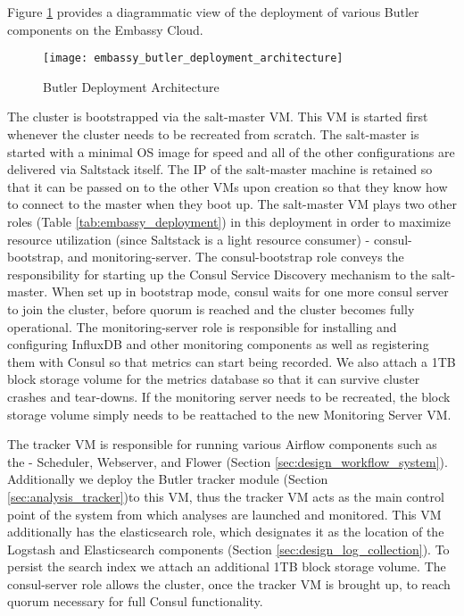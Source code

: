 Figure \ref{fig:embassy_butler_deployment_architecture} provides a diagrammatic view of the deployment of various Butler components on the Embassy Cloud.

\begin{figure}[h!]
\texttt{[image: embassy\_butler\_deployment\_architecture]}
\centering
\caption {Butler Deployment Architecture}
\label{fig:embassy_butler_deployment_architecture}
\end{figure}

The cluster is bootstrapped via the salt-master VM. This VM is started first whenever the cluster needs to be recreated from scratch. The salt-master is started with a minimal OS image for speed and all of the other configurations are delivered via Saltstack itself. The IP of the salt-master machine is retained so that it can be passed on to the other VMs upon creation so that they know how to connect to the master when they boot up. The salt-master VM plays two other roles (Table \ref{tab:embassy_deployment}) in this deployment in order to maximize resource utilization (since Saltstack is a light resource consumer) - consul-bootstrap, and monitoring-server. The consul-bootstrap role conveys the responsibility for starting up the Consul Service Discovery mechanism to the salt-master. When set up in bootstrap mode, consul waits for one more consul server to join the cluster, before quorum is reached and the cluster becomes fully operational. The monitoring-server role is responsible for installing and configuring InfluxDB and other monitoring components  as well as registering them with Consul so that metrics can start being recorded. We also attach a 1TB block storage volume for the metrics database so that it can survive cluster crashes and tear-downs. If the monitoring server needs to be recreated, the block storage volume simply needs to be reattached to the new Monitoring Server VM.

The tracker VM is responsible for running various Airflow components such as the - Scheduler, Webserver, and Flower (Section \ref{sec:design_workflow_system}). Additionally we deploy the Butler tracker module (Section \ref{sec:analysis_tracker})to this VM, thus the tracker VM acts as the main control point of the system from which analyses are launched and monitored. This VM additionally has the elasticsearch role, which designates it as the location of the Logstash and Elasticsearch components (Section \ref{sec:design_log_collection}). To persist the search index we attach an additional 1TB block storage volume. The consul-server role allows the cluster, once the tracker VM is brought up, to reach quorum necessary for full Consul functionality. 

